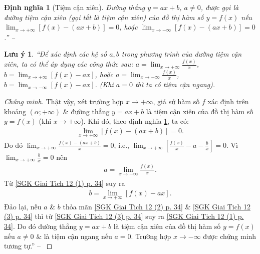 \documentclass[oneside]{book}
\numberwithin{equation}{section}
\newtheorem{dinhnghia}{Định nghĩa}[section]
\newtheorem{luuy}{Lưu ý}[section]
\begin{document}
\begin{dinhnghia}[Tiệm cận xiên]
	\label{def:tiem can xien}
	Đường thẳng $y = ax + b$, $a\ne 0$, được gọi là \emph{đường tiệm cận xiên} (gọi tắt là \emph{tiệm cận xiên}) của đồ thị hàm số $y = f(x)$ nếu $\lim_{x\to+\infty} [f(x) - (ax + b)] = 0$, hoặc $\lim_{x\to-\infty} [f(x) - (ax + b)] = 0$.'' -- \cite[p. 32]{SGK_Toan_12_giai_tich_nang_cao}
\end{dinhnghia}

\begin{luuy}
	``Để xác định các hệ số $a,b$ trong phương trình của đường tiệm cận xiên, ta có thể áp dụng các công thức sau: $a = \lim_{x\to+\infty} \frac{f(x)}{x}$, $b = \lim_{x\to+\infty} [f(x) - ax]$, hoặc $a = \lim_{x\to-\infty} \frac{f(x)}{x}$, $b = \lim_{x\to-\infty} [f(x) - ax]$. (Khi $a = 0$ thì ta có tiệm cận ngang).
\end{luuy}

\begin{proof}[Chứng minh]
	Thật vậy, xét trường hợp $x\to+\infty$, giả sử hàm số $f$ xác định trên khoảng $(\alpha;+\infty)$ \& đường thẳng $y = ax + b$ là tiệm cận xiên của đồ thị hàm số $y = f(x)$ (khi $x\to+\infty$). Khi đó, theo định nghĩa \ref{def:tiem can xien}, ta có:
	\begin{align}
		\label{SGK Giai Tich 12 (1) p. 34}
		\lim_{x\to+\infty} [f(x) - (ax + b)] = 0.
	\end{align}
	Do đó $\lim_{x\to+\infty} \frac{f(x) - (ax + b)}{x} = 0$, i.e., $\lim_{x\to+\infty} \left[\frac{f(x)}{x} - a - \frac{b}{x}\right] = 0$. Vì $\lim_{x\to+\infty} \frac{b}{x} = 0$ nên
	\begin{align}
		\label{SGK Giai Tich 12 (2) p. 34}
		a = \lim_{x\to+\infty} \frac{f(x)}{x}.
	\end{align}
	Từ \eqref{SGK Giai Tich 12 (1) p. 34} suy ra
	\begin{align}
		\label{SGK Giai Tich 12 (3) p. 34}
		b = \lim_{x\to+\infty} [f(x) - ax].
	\end{align}
	Đảo lại, nếu $a$ \& $b$ thỏa mãn \eqref{SGK Giai Tich 12 (2) p. 34} \& \eqref{SGK Giai Tich 12 (3) p. 34} thì từ \eqref{SGK Giai Tich 12 (3) p. 34} suy ra \eqref{SGK Giai Tich 12 (1) p. 34}. Do đó đường thẳng $y = ax + b$ là tiệm cận xiên của đồ thị hàm số $y = f(x)$ nếu $a\ne 0$ \& là tiệm cận ngang nếu $a = 0$. Trường hợp $x\to-\infty$ được chứng minh tương tự.'' -- \cite[p. 34]{SGK_Toan_12_giai_tich_nang_cao}
\end{proof}

\end{document}
